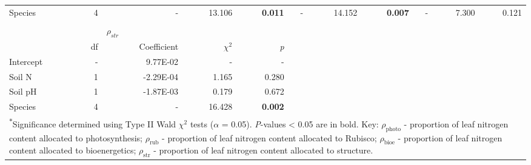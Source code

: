 \begin{landscape}
\begin{table}[]
{\begin{tabular}{p{2.5cm}p{0.5cm}p{2cm}p{1.5cm}p{1.5cm}p{2cm}p{1.5cm}p{1.5cm}p{2cm}p{1.5cm}p{1.5cm}}
                 Species & \multicolumn{1}{r}{4}
                 & \multicolumn{1}{r}{-} & \multicolumn{1}{r}{13.106} & \multicolumn{1}{r}{\textbf{0.011}}
                 & \multicolumn{1}{r}{-} & \multicolumn{1}{r}{14.152} & \multicolumn{1}{r}{\textbf{0.007}}
                 & \multicolumn{1}{r}{-} & \multicolumn{1}{r}{7.300} & \multicolumn{1}{r}{0.121}
                 \\

                 &&&&&&&&&&
                 \\

                 && \multicolumn{3}{l}{$\rho_{str}$} &&&&& \\
                 \hline
                 & \multicolumn{1}{r}{df}
                 & \multicolumn{1}{r}{Coefficient} & \multicolumn{1}{r}{$\chi^{2}$} & \multicolumn{1}{r}{\textit{p}} 
                 \\
                 \hline

                 Intercept & \multicolumn{1}{r}{-}
                 & \multicolumn{1}{r}{9.77E-02} & \multicolumn{1}{r}{-} & \multicolumn{1}{r}{-}
                 &&&&&&
                 \\

                 Soil N & \multicolumn{1}{r}{1}
                 & \multicolumn{1}{r}{-2.29E-04}  & \multicolumn{1}{r}{1.165} & \multicolumn{1}{r}{0.280}
                 &&&&&& 
                 \\

                 Soil pH & \multicolumn{1}{r}{1}
                 & \multicolumn{1}{r}{-1.87E-03} & \multicolumn{1}{r}{0.179} & \multicolumn{1}{r}{0.672}
                 &&&&&& 
                 \\

                 Species & \multicolumn{1}{r}{4}
                 & \multicolumn{1}{r}{-} & \multicolumn{1}{r}{16.428} & \multicolumn{1}{r}{\textbf{0.002}}
                 &&&&&&
                 \\
                 \hline

                 \multicolumn{11}{p{22.5cm}}{\textsuperscript{$*$}Significance determined using Type II Wald $\chi^{2}$ tests ($\alpha$ = 0.05). \textit{P}-values < 0.05 are in bold. Key: $\rho_\mathrm{photo}$ - proportion of leaf nitrogen content allocated to photosynthesis; $\rho_\mathrm{rub}$ - proportion of leaf nitrogen content allocated to Rubisco; $\rho_\mathrm{bioe}$ - proportion of leaf nitrogen content allocated to bioenergetics; $\rho_\mathrm{str}$ - proportion of leaf nitrogen content allocated to structure.}
        \end{tabular}}
        \label{tab:table3.3}
        \end{table}
    \end{landscape}
    \clearpage

